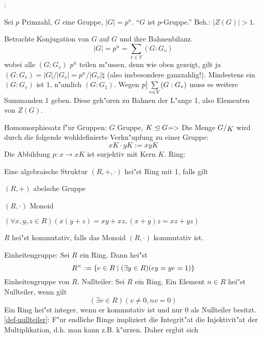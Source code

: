 \example:{
  Sei $p$ Primzahl, $G$ eine Gruppe, $|G|=p^n$. ``$G$ ist $p$-Gruppe.''
  Beh.: $|Z(G)|>1$.
  
  Betrachte Konjugation von $G$ auf $G$ und ihre Bahnenbilanz.
  \[|G|=p^n=\sum_{v\in V} (G:G_v)
    \]
  wobei alle $(G:G_v)$ $p^n$ teilen m"ussen, denn wie oben gezeigt, gilt ja
  $(G:G_v)=|G|/|G_v|=p^n/|G_v|\natural$ (also insbesondere ganzzahlig!).
  Mindestens ein $(G:G_v)$ ist $1$, n"amlich $(G:G_1)$. Wegen 
  $p\divides\sum_{v\in V} (G:G_v)$ muss es weitere Summanden 1 geben. 
  Diese geh"oren zu Bahnen der L"ange 1, also Elementen von $Z(G)$.
  }
\theorem Homomorphiesatz f"ur Gruppen: $G$ Gruppe, $K\trianglelefteq G$=>{
  Die Menge $\rcoset G K$ wird durch die folgende wohldefinierte
  Verkn"upfung zu einer Gruppe:
  \[xK\cdot yK:=xyK
    \]
  Die Abbildung $p:x\to xK$ ist surjektiv mit Kern $K$.
  }
 Ring:{
  Eine algebraische Struktur $(R,+,\cdot)$ hei"st Ring mit 1, falls gilt
  \begin{stmts}
    \item $(R,+)$ abelsche Gruppe
    \item $(R,\cdot)$ Monoid
    \item $(\forall x,y,z\in R)(x(y+z)=xy+xz,(x+y)z=xz+yz)$ 
    \item $R$ hei"st kommutativ, falls das Monoid $(R,\cdot)$ kommutativ ist.
  \end{stmts}
  }
 Einheitengruppe:{
  Sei $R$ ein Ring. Dann hei"st 
  \[R^\times:=\{e\in R\mid (\exists y\in R)(ey=ye=1)\}
    \]
  Einheitengruppe von $R$.
  }
 Nullteiler:{
  \label{def-nullteiler}
  Sei $R$ ein Ring. Ein Element $n\in R$ hei"st Nullteiler, wenn gilt
  \[(\exists v\in R)(v\ne 0,nv=0)
    \]
  Ein Ring hei"st integer, wenn er kommutativ ist und nur $0$ als Nullteiler
  besitzt. 
  }
\annotation\ref{def-nullteiler}:{
  F"ur endliche Ringe impliziert die Integrit"at die Injektivit"at der
  Multiplikation, d.h. man kann z.B. k"urzen. Daher ergbit sich
  }
